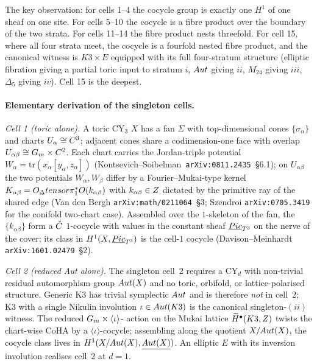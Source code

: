 \noindent The key observation: for cells 1--4 the cocycle group is
exactly one $H^{1}$ of one sheaf on one site. For cells 5--10 the
cocycle is a fibre product over the boundary of the two strata. For
cells 11--14 the fibre product nests threefold. For cell 15, where
all four strata meet, the cocycle is a fourfold nested fibre product,
and the canonical witness is $K3\times E$ equipped with its full
four-stratum structure (elliptic fibration giving a partial toric
input to stratum $i$, $Aut$ giving $ii$, $M_{24}$ giving $iii$,
$\Delta_{5}$ giving $iv$). Cell 15 is the deepest.

\paragraph{Elementary derivation of the singleton cells.}

\emph{Cell 1 (toric alone).} A toric CY$_{3}$ $X$ has a fan $\Sigma$
with top-dimensional cones $\{\sigma_{\alpha}\}$ and charts
$U_{\alpha}\cong C^{3}$; adjacent cones share a codimension-one face
with overlap $U_{\alpha\beta}\cong G_{m}\times C^{2}$. Each chart carries
the Jordan-triple potential $W_{\alpha}=\mathrm{tr}(x_{\alpha}[y_{\alpha},
z_{\alpha}])$ (Kontsevich--Soibelman~\texttt{arXiv:0811.2435}~\S 6.1);
on $U_{\alpha\beta}$ the two potentials $W_{\alpha}, W_{\beta}$ differ
by a Fourier--Mukai-type kernel
$K_{\alpha\beta}=O_{\Delta}tensor\pi_{1}^{*}O(k_{\alpha\beta})$
with $k_{\alpha\beta}\in Z$ dictated by the primitive ray of the shared
edge (Van den Bergh \texttt{arXiv:math/0211064}~\S 3; Szendroi
\texttt{arXiv:0705.3419} for the conifold two-chart case). Assembled
over the $1$-skeleton of the fan, the $\{k_{\alpha\beta}\}$ form a
$\check{C}$ $1$-cocycle with values in the constant sheaf
$\underline{Pic}_{T^{3}}$ on the nerve of the cover; its class in
$H^{1}(X,\underline{Pic}_{T^{3}})$ is the cell-$1$ cocycle
(Davison--Meinhardt \texttt{arXiv:1601.02479}~\S 2).

\emph{Cell 2 (reduced Aut alone).} The singleton cell~$2$ requires a
CY$_{d}$ with non-trivial residual automorphism group $Aut(X)$ and
no toric, orbifold, or lattice-polarised structure. Generic K3 has
trivial symplectic $Aut$ and is therefore \emph{not} in cell~$2$;
K3 with a single Nikulin involution $\iota\in Aut(K3)$ is the canonical
singleton-$(ii)$ witness. The reduced $G_{m}\times\langle\iota\rangle$-
action on the Mukai lattice $\widetilde H^{\bullet}(K3,Z)$ twists the
chart-wise CoHA by a $\langle\iota\rangle$-cocycle; assembling along
the quotient $X/Aut(X)$, the cocycle class lives in
$H^{1}(X/Aut(X),\underline{Aut(X)})$. An elliptic $E$ with its
inversion involution realises cell~$2$ at $d=1$.

